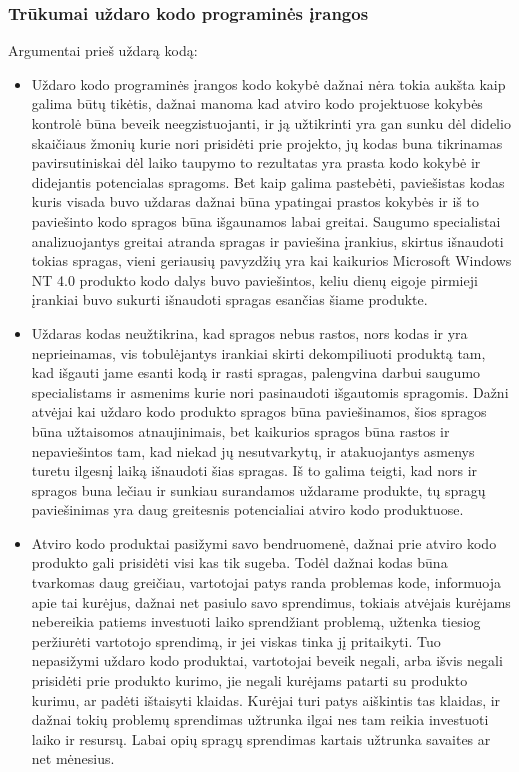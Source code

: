 \documentclass[a4paper,12pt,fleqn]{article}
\begin{document}
\subsubsection{Trūkumai uždaro kodo programinės įrangos}
\label{sec:data}
Argumentai prieš uždarą kodą:
\begin{itemize}
	\item Uždaro kodo programinės įrangos kodo kokybė dažnai nėra tokia aukšta kaip galima būtų tikėtis, dažnai manoma kad atviro kodo projektuose kokybės kontrolė būna beveik neegzistuojanti, ir ją užtikrinti yra gan sunku dėl didelio skaičiaus žmonių kurie nori prisidėti prie projekto, jų kodas buna tikrinamas pavirsutiniskai dėl laiko taupymo to rezultatas yra prasta kodo kokybė ir didejantis potencialas spragoms. Bet kaip galima pastebėti, paviešistas kodas kuris visada buvo uždaras dažnai būna ypatingai prastos kokybės ir iš to paviešinto kodo spragos būna išgaunamos labai greitai. Saugumo specialistai analizuojantys greitai atranda spragas ir paviešina įrankius, skirtus išnaudoti tokias spragas, vieni geriausių pavyzdžių yra kai kaikurios Microsoft Windows NT 4.0 produkto kodo dalys buvo paviešintos, keliu dienų eigoje pirmieji įrankiai buvo sukurti išnaudoti spragas esančias šiame produkte. \cite{HoepmanJaap}
	\item Uždaras kodas neužtikrina, kad spragos nebus rastos, nors kodas ir yra neprieinamas, vis tobulėjantys irankiai skirti dekompiliuoti produktą tam, kad išgauti jame esanti kodą ir rasti spragas, palengvina darbui saugumo specialistams ir asmenims kurie nori pasinaudoti išgautomis spragomis. Dažni atvėjai kai uždaro kodo produkto spragos būna paviešinamos, šios spragos būna užtaisomos atnaujinimais, bet kaikurios spragos būna rastos ir nepaviešintos tam, kad niekad jų nesutvarkytų, ir atakuojantys asmenys turetu ilgesnį laiką išnaudoti šias spragas. Iš to galima teigti, kad nors ir spragos buna lečiau ir sunkiau surandamos uždarame produkte, tų spragų paviešinimas yra daug greitesnis potencialiai atviro kodo produktuose. \cite{HoepmanJaap}
	\item Atviro kodo produktai pasižymi savo bendruomenė, dažnai prie atviro kodo produkto gali prisidėti visi kas tik sugeba. Todėl dažnai kodas būna tvarkomas daug greičiau, vartotojai patys randa problemas kode, informuoja apie tai kurėjus, dažnai net pasiulo savo sprendimus, tokiais atvėjais kurėjams nebereikia patiems investuoti laiko sprendžiant problemą, užtenka tiesiog peržiurėti vartotojo sprendimą, ir jei viskas tinka jį pritaikyti. Tuo nepasižymi uždaro kodo produktai, vartotojai beveik negali, arba išvis negali prisidėti prie produkto kurimo, jie negali kurėjams patarti su produkto kurimu, ar padėti ištaisyti klaidas. Kurėjai turi patys aiškintis tas klaidas, ir dažnai tokių problemų sprendimas užtrunka ilgai nes tam reikia investuoti laiko ir resursų. Labai opių spragų sprendimas kartais užtrunka savaites ar net mėnesius. \cite{HoepmanJaap}
\end{itemize}
\end{document}
